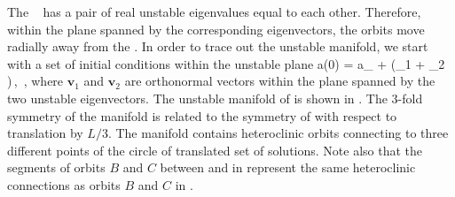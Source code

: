The \eqv\  has a pair of real unstable eigenvalues
equal to each other.  Therefore, within the plane spanned by the
corresponding eigenvectors, the orbits move radially away from
the \eqv.  In order to trace out the unstable manifold,
we start with a set of initial conditions within the unstable plane
\beq
 a(0) = a_{{}} + \epsilon(_1 \cos \phi + _2 \sin \phi)\,,
  \quad\phi\in[0,2\pi]\,,
\label{unsManSeed}
\eeq
where $\mathbf{v}_1$ and $\mathbf{v}_2$ are orthonormal vectors within the
plane spanned by the two unstable eigenvectors.
  The unstable manifold
of  is shown in .  The 3-fold symmetry of
the manifold is related to the symmetry of  with respect to
translation by $L/3$.  The manifold contains heteroclinic orbits
connecting  to three different points of the circle of {\eqva}
 translated set of solutions. Note also that the segments of orbits $B$ and $C$
between  and  in 
represent the same heteroclinic connections as orbits $B$ and $C$ in
.

